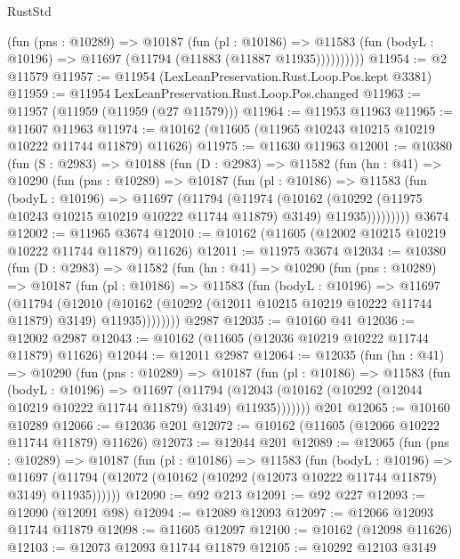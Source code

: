 \begin{lexlean}{RustStd}
\begin{coremodule}
            (fun (pns : @10289) =>
            @10187
              (fun (pl : @10186) =>
              @11583 (fun (bodyL : @10196) => @11697 (@11794 (@11883 (@11887 @11935))))))))))
@11954 := @2 @11579
@11957 := @11954 (LexLeanPreservation.Rust.Loop.Pos.kept @3381)
@11959 := @11954 LexLeanPreservation.Rust.Loop.Pos.changed
@11963 := @11957 (@11959 (@11959 (@27 @11579)))
@11964 := @11953 @11963
@11965 := @11607 @11963
@11974 := @10162 (@11605 (@11965 @10243 @10215 @10219 @10222 @11744 @11879) @11626)
@11975 := @11630 @11963
@12001 := @10380
    (fun (S : @2983) =>
    @10188
      (fun (D : @2983) =>
      @11582
        (fun (hn : @41) =>
        @10290
          (fun (pns : @10289) =>
          @10187
            (fun (pl : @10186) =>
            @11583
              (fun (bodyL : @10196) =>
              @11697
                (@11794
                  (@11974
                    (@10162
                      (@10292 (@11975 @10243 @10215 @10219 @10222 @11744 @11879) @3149)
                      @11935)))))))))
    @3674
@12002 := @11965 @3674
@12010 := @10162 (@11605 (@12002 @10215 @10219 @10222 @11744 @11879) @11626)
@12011 := @11975 @3674
@12034 := @10380
    (fun (D : @2983) =>
    @11582
      (fun (hn : @41) =>
      @10290
        (fun (pns : @10289) =>
        @10187
          (fun (pl : @10186) =>
          @11583
            (fun (bodyL : @10196) =>
            @11697
              (@11794
                (@12010
                  (@10162 (@10292 (@12011 @10215 @10219 @10222 @11744 @11879) @3149) @11935))))))))
    @2987
@12035 := @10160 @41
@12036 := @12002 @2987
@12043 := @10162 (@11605 (@12036 @10219 @10222 @11744 @11879) @11626)
@12044 := @12011 @2987
@12064 := @12035
    (fun (hn : @41) =>
    @10290
      (fun (pns : @10289) =>
      @10187
        (fun (pl : @10186) =>
        @11583
          (fun (bodyL : @10196) =>
          @11697
            (@11794
              (@12043 (@10162 (@10292 (@12044 @10219 @10222 @11744 @11879) @3149) @11935)))))))
    @201
@12065 := @10160 @10289
@12066 := @12036 @201
@12072 := @10162 (@11605 (@12066 @10222 @11744 @11879) @11626)
@12073 := @12044 @201
@12089 := @12065
    (fun (pns : @10289) =>
    @10187
      (fun (pl : @10186) =>
      @11583
        (fun (bodyL : @10196) =>
        @11697 (@11794 (@12072 (@10162 (@10292 (@12073 @10222 @11744 @11879) @3149) @11935))))))
@12090 := @92 @213
@12091 := @92 @227
@12093 := @12090 (@12091 @98)
@12094 := @12089 @12093
@12097 := @12066 @12093 @11744 @11879
@12098 := @11605 @12097
@12100 := @10162 (@12098 @11626)
@12103 := @12073 @12093 @11744 @11879
@12105 := @10292 @12103 @3149

\end{coremodule}
\end{lexlean}
